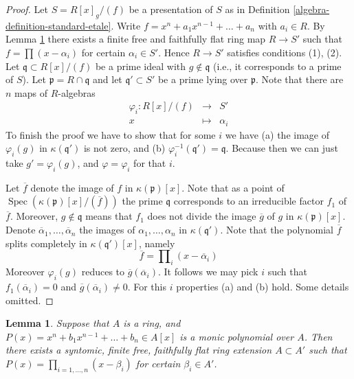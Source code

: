 \documentclass{amsart}
\theoremstyle{plain}
\newtheorem{lemma}[subsection]{Lemma}
\theoremstyle{definition}
\theoremstyle{remark}
\numberwithin{equation}{subsection}
\def\Spec{\mathop{\mathrm{Spec}}}
\begin{document}
\begin{proof}
Let $S = R[x]_g/(f)$ be a presentation of $S$ as in
Definition \ref{algebra-definition-standard-etale}.
Write $f = x^n + a_1 x^{n - 1} + \ldots + a_n$ with $a_i \in R$.
By Lemma \ref{algebra-lemma-adjoin-roots} there exists a finite free
and faithfully flat ring map $R \to S'$ such that $f = \prod (x - \alpha_i)$
for certain $\alpha_i \in S'$. Hence $R \to S'$ satisfies conditions (1), (2).
Let $\mathfrak q \subset R[x]/(f)$ be a prime ideal with
$g \not \in \mathfrak q$ (i.e., it corresponds to a prime of $S$).
Let $\mathfrak p = R \cap \mathfrak q$ and let
$\mathfrak q' \subset S'$ be a prime lying over $\mathfrak p$.
Note that there are
$n$ maps of $R$-algebras
\begin{eqnarray*}
\varphi_i : R[x]/(f) & \longrightarrow & S' \\
x & \longmapsto & \alpha_i
\end{eqnarray*}
To finish the proof we have to show that for some $i$ we have
(a) the image of $\varphi_i(g)$ in $\kappa(\mathfrak q')$ is not zero,
and (b) $\varphi_i^{-1}(\mathfrak q') = \mathfrak q$.
Because then we can just take $g' = \varphi_i(g)$, and
$\varphi = \varphi_i$ for that $i$.

\medskip\noindent
Let $\overline{f}$ denote the image of $f$ in $\kappa(\mathfrak p)[x]$.
Note that as a point of $\Spec(\kappa(\mathfrak p)[x]/(\overline{f}))$
the prime $\mathfrak q$ corresponds to an irreducible factor
$f_1$ of $\overline{f}$. Moreover, $g \not \in \mathfrak q$ means
that $f_1$ does not divide the image $\overline{g}$ of $g$ in
$\kappa(\mathfrak p)[x]$.
Denote $\overline{\alpha}_1, \ldots, \overline{\alpha}_n$ the images
of $\alpha_1, \ldots, \alpha_n$ in $\kappa(\mathfrak q')$.
Note that the polynomial $\overline{f}$ splits completely
in $\kappa(\mathfrak q')[x]$, namely
$$
\overline{f} = \prod\nolimits_i (x - \overline{\alpha}_i)
$$
Moreover $\varphi_i(g)$ reduces to $\overline{g}(\overline{\alpha}_i)$.
It follows we may pick $i$ such that $f_1(\overline{\alpha}_i) = 0$ and
$\overline{g}(\overline{\alpha}_i) \not = 0$.
For this $i$ properties (a) and (b) hold. Some details omitted.
\end{proof}


\begin{lemma}
\label{algebra-lemma-adjoin-roots}
Suppose that $A$ is a ring, and
$P(x) = x^n + b_1 x^{n-1} + \ldots + b_n \in A[x]$ is
a monic polynomial over $A$. Then there exists a
syntomic, finite free, faithfully flat ring extension
$A \subset A'$ such that $P(x) = \prod_{i = 1, \ldots, n} (x - \beta_i)$
for certain $\beta_i \in A'$.
\end{lemma}
\end{document}
